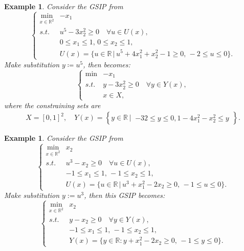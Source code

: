 \documentclass{amsart}
\theoremstyle{plain}
\newtheorem{exmp}[theorem]{Example}
\newcommand{\re}{\mathbb{R}}
\newcommand{\st}{\mathit{s.t.}}
\numberwithin{equation}{section}
\begin{document}
		
		\begin{exmp}\label{GlibP16}
			Consider the GSIP from \cite{vasquez2005}
			\[
			\left\{\begin{array}{ll}
				\min\limits_{x\in\re^2} & -x_1\\
				\st & u^5-3x_2^2\ge 0\quad \forall u\in U(x),\\
				& 0\le x_1\le 1,\, 0\le x_2\le 1,\\
				& U(x) = \{u\in\re\,\vert\, u^5+4x_1^2+x_2^2-1\ge 0,\, -2\le u\le 0\}.
			\end{array}
			\right.
			\]
			Make substitution $y\coloneqq u^5$, then  becomes:
			\[
			\left\{
			\begin{array}{lll}
				\min& -x_1\\
				\st & y-3x^2_2\geq 0\quad\forall y\in Y(x),\\
				& x\in X,
			\end{array}
			\right.
			\]
			where the constraining sets are
			\[
			\begin{array}{ll}
				X=[0,1]^2, \quad
				Y(x)=\left\{y\in\mathbb{R} \,\vert\,
				\begin{array}{lll}
					-32\leq y\leq 0, 1-4x^2_1-x^2_2\leq y
				\end{array}\right\}.
			\end{array}
			\]
		\end{exmp}
		
		\begin{exmp}\label{GlibP11}
		Consider the GSIP from \cite{JongenRS98}
			\[
			\left\{\begin{array}{ll}
				\min\limits_{x\in\re^2} & x_2\\
				\st & u^3-x_2\ge 0\quad \forall u\in U(x),\\
				& -1\le x_1\le 1,\, -1\le x_2\le 1,\\
				& U(x) = \{u\in\re\,\vert\, u^3+x_1^2-2x_2\ge 0,\, -1\le u\le 0\}.
			\end{array}
			\right.
			\]
			Make substitution $y:=u^3$, then this GSIP becomes:
			\[
			\left\{\begin{array}{ll}
				\min\limits_{x\in\re^2} & x_2\\
				\st & y-x_2\ge 0\quad \forall y\in Y(x),\\
				& -1\le x_1\le 1,\, -1\le x_2\le 1,\\
				& Y(x) = \{y\in\re: y+x_1^2-2x_2\ge 0,\, -1\le y\le 0\}.
			\end{array}
			\right.
			\]
		\end{exmp}
		
\end{document}

